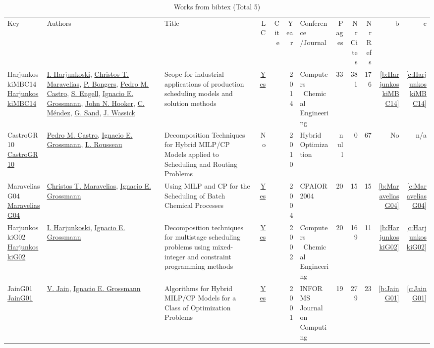 {\scriptsize
\begin{longtable}{>{\raggedright\arraybackslash}p{3cm}>{\raggedright\arraybackslash}p{6cm}>{\raggedright\arraybackslash}p{6.5cm}rrrp{2.5cm}rrrrr}
\rowcolor{white}\caption{Works from bibtex (Total 5)}\\ \toprule
\rowcolor{white}Key & Authors & Title & LC & Cite & Year & \shortstack{Conference\\/Journal} & Pages & \shortstack{Nr\\Cites} & \shortstack{Nr\\Refs} & b & c \\ \midrule\endhead
\bottomrule
\endfoot
HarjunkoskiMBC14 \href{http://dx.doi.org/10.1016/j.compchemeng.2013.12.001}{HarjunkoskiMBC14} & \hyperref[auth:a884]{I. Harjunkoski}, \hyperref[auth:a387]{Christos T. Maravelias}, \hyperref[auth:a959]{P. Bongers}, \hyperref[auth:a907]{Pedro M. Castro}, \hyperref[auth:a70]{S. Engell}, \hyperref[auth:a388]{Ignacio E. Grossmann}, \hyperref[auth:a162]{John N. Hooker}, \hyperref[auth:a960]{C. Méndez}, \hyperref[auth:a961]{G. Sand}, \hyperref[auth:a962]{J. Wassick} & Scope for industrial applications of production scheduling models and solution methods & \href{works/HarjunkoskiMBC14.pdf}{Yes} & \cite{HarjunkoskiMBC14} & 2014 & Computers \  Chemical Engineering & 33 & 381 & 176 & \ref{b:HarjunkoskiMBC14} & \ref{c:HarjunkoskiMBC14}\\
CastroGR10 \href{http://dx.doi.org/10.1007/978-1-4419-1644-0_4}{CastroGR10} & \hyperref[auth:a907]{Pedro M. Castro}, \hyperref[auth:a388]{Ignacio E. Grossmann}, \hyperref[auth:a908]{L. Rousseau} & Decomposition Techniques for Hybrid MILP/CP Models applied to Scheduling and Routing Problems & No & \cite{CastroGR10} & 2010 & Hybrid Optimization & null & 0 & 67 & No & n/a\\
MaraveliasG04 \href{https://doi.org/10.1007/978-3-540-24664-0\_1}{MaraveliasG04} & \hyperref[auth:a387]{Christos T. Maravelias}, \hyperref[auth:a388]{Ignacio E. Grossmann} & Using {MILP} and {CP} for the Scheduling of Batch Chemical Processes & \href{works/MaraveliasG04.pdf}{Yes} & \cite{MaraveliasG04} & 2004 & CPAIOR 2004 & 20 & 15 & 15 & \ref{b:MaraveliasG04} & \ref{c:MaraveliasG04}\\
HarjunkoskiG02 \href{http://dx.doi.org/10.1016/s0098-1354(02)00100-x}{HarjunkoskiG02} & \hyperref[auth:a884]{I. Harjunkoski}, \hyperref[auth:a388]{Ignacio E. Grossmann} & Decomposition techniques for multistage scheduling problems using mixed-integer and constraint programming methods & \href{works/HarjunkoskiG02.pdf}{Yes} & \cite{HarjunkoskiG02} & 2002 & Computers \  Chemical Engineering & 20 & 169 & 11 & \ref{b:HarjunkoskiG02} & \ref{c:HarjunkoskiG02}\\
JainG01 \href{http://dx.doi.org/10.1287/ijoc.13.4.258.9733}{JainG01} & \hyperref[auth:a857]{V. Jain}, \hyperref[auth:a388]{Ignacio E. Grossmann} & Algorithms for Hybrid MILP/CP Models for a Class of Optimization Problems & \href{works/JainG01.pdf}{Yes} & \cite{JainG01} & 2001 & INFORMS Journal on Computing & 19 & 279 & 23 & \ref{b:JainG01} & \ref{c:JainG01}\\
\end{longtable}
}

